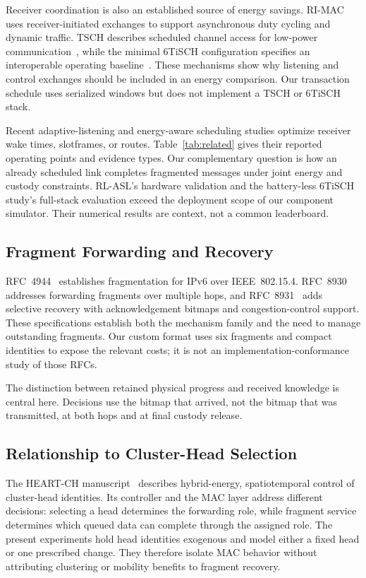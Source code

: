 \documentclass[journal,10pt]{IEEEtran}
\begin{document}
Receiver coordination is also an established source of energy savings. RI-MAC~\cite{rimac} uses receiver-initiated exchanges to support asynchronous duty cycling and dynamic traffic. TSCH describes scheduled channel access for low-power communication~\cite{rfc7554}, while the minimal 6TiSCH configuration specifies an interoperable operating baseline~\cite{rfc8180}. These mechanisms show why listening and control exchanges should be included in an energy comparison. Our transaction schedule uses serialized windows but does not implement a TSCH or 6TiSCH stack.

Recent adaptive-listening and energy-aware scheduling studies optimize receiver wake times, slotframes, or routes. Table~\ref{tab:related} gives their reported operating points and evidence types. Our complementary question is how an already scheduled link completes fragmented messages under joint energy and custody constraints. RL-ASL's hardware validation and the battery-less 6TiSCH study's full-stack evaluation exceed the deployment scope of our component simulator. Their numerical results are context, not a common leaderboard.

\subsection{Fragment Forwarding and Recovery}
RFC~4944~\cite{rfc4944} establishes fragmentation for IPv6 over IEEE~802.15.4. RFC~8930~\cite{rfc8930} addresses forwarding fragments over multiple hops, and RFC~8931~\cite{rfc8931} adds selective recovery with acknowledgement bitmaps and congestion-control support. These specifications establish both the mechanism family and the need to manage outstanding fragments. Our custom format uses six fragments and compact identities to expose the relevant costs; it is not an implementation-conformance study of those RFCs.

The distinction between retained physical progress and received knowledge is central here. Decisions use the bitmap that arrived, not the bitmap that was transmitted, at both hops and at final custody release.

\subsection{Relationship to Cluster-Head Selection}
The HEART-CH manuscript~\cite{heart} describes hybrid-energy, spatiotemporal control of cluster-head identities. Its controller and the MAC layer address different decisions: selecting a head determines the forwarding role, while fragment service determines which queued data can complete through the assigned role. The present experiments hold head identities exogenous and model either a fixed head or one prescribed change. They therefore isolate MAC behavior without attributing clustering or mobility benefits to fragment recovery.
\end{document}
